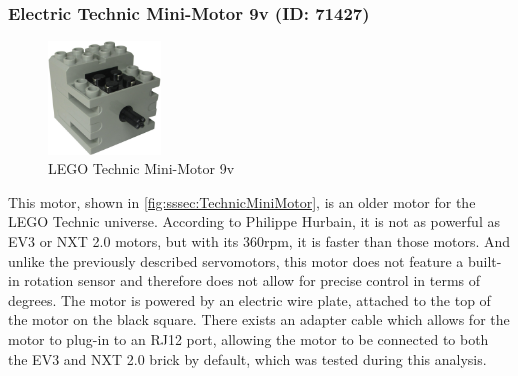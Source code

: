\subsubsection{Electric Technic Mini-Motor 9v (ID: 71427)}
\begin{figure}[H]
  \centering
  \includegraphics[width=3cm]{images/techAnalysis/LegoTechnicMiniMotor.jpg}
  \caption{LEGO Technic Mini-Motor 9v \cite{BrickOWl-figure-Technic-MiniMotor9v}}\label{fig:sssec:TechnicMiniMotor}
\end{figure}
This motor, shown in \autoref{fig:sssec:TechnicMiniMotor}, is an older motor for the LEGO Technic universe.
According to Philippe Hurbain, it is not as powerful as EV3 or NXT 2.0 motors, but with its 360rpm, it is faster than those motors.
And unlike the previously described servomotors, this motor does not feature a built-in rotation sensor and therefore does not allow for precise control in terms of degrees.
The motor is powered by an electric wire plate, attached to the top of the motor on the black square.
There exists an adapter cable which allows for the motor to plug-in to an RJ12 port, allowing the motor to be connected to both the EV3 and NXT 2.0 brick by default, which was tested during this analysis.
\cite{hurbain_lego_technicmotorComp}
